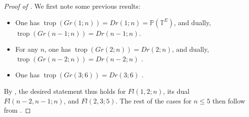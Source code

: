 \documentclass[11pt]{amsart}
\newcommand{\PP}{\mathbb P}
\newcommand{\TT}{\mathbb T}
\newcommand{\trop}{\operatorname{trop}}
\theoremstyle{definition}
\newcommand{\chris}[1]{{\color{cyan} \sf Chris: [#1]}}
\begin{document}
\begin{proof}[Proof of ]
We first note some previous results:
\begin{itemize}
\item One has $\trop(Gr(1;n)) = Dr(1;n) = \PP(\TT^E)$, and dually, $\trop(Gr(n-1;n)) = Dr(n-1;n)$.
\item For any $n$, one has $\trop(Gr(2;n)) = Dr(2;n)$, and dually, $\trop(Gr(n-2;n)) = Dr(n-2;n)$ \cite[Corollary 4.3.12]{MS15}.
\item One has $\trop(Gr(3;6)) = Dr(3;6)$ \cite[Example 4.4.10]{MS15}.
\end{itemize}
By , the desired statement thus holds for $Fl(1,2;n)$, its dual $Fl(n-2,n-1;n)$, and $Fl(2,3;5)$.  The rest of the cases for $n\leq 5$ then follow from .
\end{proof}

\end{document}
